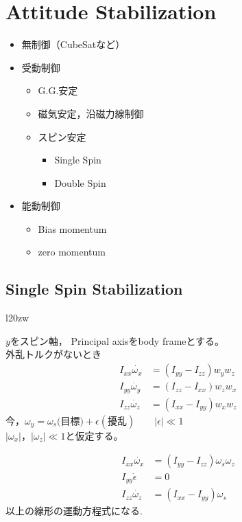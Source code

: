 \documentclass[class=article, crop=false, dvipdfmx]{standalone}
\begin{document}
\section{Attitude Stabilization}
\renewcommand{\labelitemi}{---}
\begin{itemize}
\item 無制御（CubeSatなど）
\item 受動制御
	\begin{itemize}
    \item G.G.安定
    \item 磁気安定，沿磁力線制御
    \item スピン安定
    	\begin{itemize}
        \item Single Spin
        \item Double Spin
        \end{itemize}
    \end{itemize}
\item 能動制御
	\begin{itemize}
    \item Bias momentum
    \item zero momentum
    \end{itemize}
\end{itemize}
\renewcommand{\labelitemi}{\textbullet}


\subsection{Single Spin Stabilization}

\begin{wrapfigure}{l}{20zw}

\end{wrapfigure}

$y$をスピン軸，
Principal axisをbody frameとする。\\
外乱トルクがないとき
\begin{align}
I_{xx}\dot{\omega_x}&=(I_{yy}-I_{zz})w_yw_z\\
I_{yy}\dot{\omega_y}&=(I_{zz}-I_{xx})w_zw_x\\
I_{zz}\dot{\omega_z}&=(I_{xx}-I_{yy})w_xw_z
\end{align}
今，$\omega_y=\omega_s(\mbox{目標)}+\epsilon(\mbox{擾乱})\qquad |\epsilon| \ll 1$\\
$|\omega_x|，|\omega_z| \ll 1$と仮定する。

\begin{align}
I_{xx}\dot{\omega_x} &= (I_{yy}-I_{zz})\omega_s\omega_z\\
I_{yy}\dot{\epsilon} &= 0 \\
I_{zz}\dot{\omega_z} &= (I_{xx}-I_{yy})\omega_s
\end{align}
以上の線形の運動方程式になる.
\end{document}
